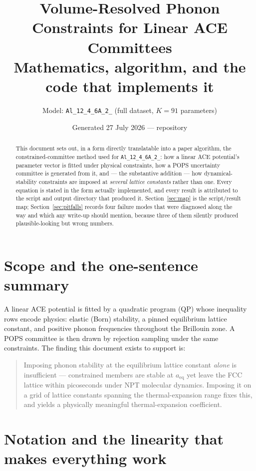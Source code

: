 \documentclass[11pt,a4paper]{article}
\title{\bfseries Volume-Resolved Phonon Constraints for Linear ACE Committees\\[2mm]
\large Mathematics, algorithm, and the code that implements it}
\author{Model: \texttt{Al\_12\_4\_6A\_2\_} (full dataset, $K=91$ parameters)}
\date{Generated 27 July 2026 --- repository \file{/storage/astro2/phupfb/PhD/acestuff/ACEWorkflow}}
\newcommand{\aeq}{a_{\mathrm{eq}}}
\begin{document}
\maketitle

\begin{abstract}
\noindent
This document sets out, in a form directly translatable into a paper algorithm, the
constrained-committee method used for \texttt{Al\_12\_4\_6A\_2\_}: how a linear ACE
potential's parameter vector is fitted under physical constraints, how a POPS
uncertainty committee is generated from it, and --- the substantive addition --- how
dynamical-stability constraints are imposed at \emph{several lattice constants} rather
than one. Every equation is stated in the form actually implemented, and every result is
attributed to the script and output directory that produced it. Section~\ref{sec:map}
is the script/result map; Section~\ref{sec:pitfalls} records four failure modes that
were diagnosed along the way and which any write-up should mention, because three of
them silently produced plausible-looking but wrong numbers.
\end{abstract}

\tableofcontents

\section{Scope and the one-sentence summary}

A linear ACE potential is fitted by a quadratic program (QP) whose inequality rows
encode physics: elastic (Born) stability, a pinned equilibrium lattice constant, and
positive phonon frequencies throughout the Brillouin zone. A POPS committee is then
drawn by rejection sampling under the same constraints. The finding this document
exists to support is:

\begin{quote}
Imposing phonon stability at the equilibrium lattice constant \emph{alone} is
insufficient --- constrained members are stable at $\aeq$ yet leave the FCC lattice
within picoseconds under NPT molecular dynamics. Imposing it on a grid of lattice
constants spanning the thermal-expansion range fixes this, and yields a physically
meaningful thermal-expansion coefficient.
\end{quote}

\section{Notation and the linearity that makes everything work}
\label{sec:notation}
\end{document}
